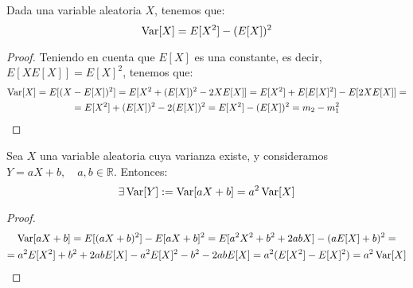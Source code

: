 \begin{prop}
    Dada una variable aleatoria $X$, tenemos que:
    \begin{equation*}
        \operatorname{Var}[X] = E[X^2] - (E[X])^2
    \end{equation*}
\end{prop}
\begin{proof}
    Teniendo en cuenta que $E[X]$ es una constante, es decir, $E[XE[X]]=E[X]^2$, tenemos que:
    \begin{multline*}
        \operatorname{Var}[X] = E[(X-E[X])^2] = E[X^2 + (E[X])^2 - 2XE[X]]
        = E[X^2] + E[E[X]^2] - E[2XE[X]] =\\=
        E[X^2] + (E[X])^2 -2(E[X])^2
        = E[X^2] - (E[X])^2 = m_2-m_1^2
    \end{multline*}
\end{proof}


\begin{prop}
    Sea $X$ una variable aleatoria cuya varianza existe, y consideramos $Y=aX+b,\quad a,b\in \mathbb{R}$. Entonces:
    \begin{equation*}
        \exists \operatorname{Var}[Y] := \operatorname{Var}[aX+b] = a^2\operatorname{Var}[X]
    \end{equation*}
\end{prop}
\begin{proof}
    \begin{multline*}
        \operatorname{Var}[aX+b]
        = E[(aX+b)^2] -E[aX+b]^2
        = E[a^2X^2 + b^2 +2abX] - (aE[X]+b)^2
        =\\= a^2E[X^2] + b^2 +2abE[X] -a^2E[X]^2 -b^2 -2abE[X] =  a^2(E[X^2] - E[X]^2) = a^2\operatorname{Var}[X]
    \end{multline*}
\end{proof}


